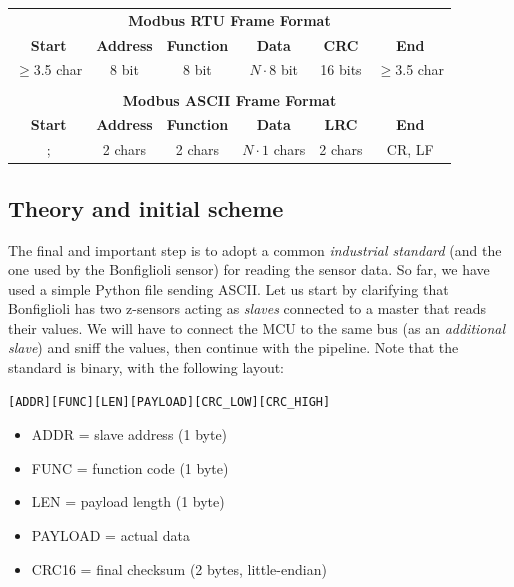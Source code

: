 \begin{table}[h]
\centering
\begin{tabular}{c c c c c c}
\multicolumn{6}{c}{\textbf{Modbus RTU Frame Format}}\\[4pt]
\textbf{Start} & \textbf{Address} & \textbf{Function} & \textbf{Data} & \textbf{CRC} & \textbf{End} \\
$\geq$3.5 char & 8 bit & 8 bit & $N \cdot 8$ bit & 16 bits & $\geq$3.5 char \\
\\
\multicolumn{6}{c}{\textbf{Modbus ASCII Frame Format}}\\[4pt]
\textbf{Start} & \textbf{Address} & \textbf{Function} & \textbf{Data} & \textbf{LRC} & \textbf{End} \\
; & 2 chars & 2 chars & $N \cdot 1$ chars & 2 chars & CR, LF \\
\end{tabular}
\end{table}

\subsection{Theory and initial scheme}

The final and important step is to adopt a common \textit{industrial standard} (and the one used by the Bonfiglioli sensor) for reading the sensor data. So far, we have used a simple Python file sending ASCII.  
Let us start by clarifying that Bonfiglioli has two z-sensors acting as \emph{slaves} connected to a master that reads their values. We will have to connect the MCU to the same bus (as an \textit{additional slave}) and sniff the values, then continue with the pipeline. Note that the standard is binary, with the following layout:

\begin{verbatim}
[ADDR][FUNC][LEN][PAYLOAD][CRC_LOW][CRC_HIGH]
\end{verbatim}

\begin{itemize}
    \item ADDR = slave address (1 byte)
    \item FUNC = function code (1 byte)
    \item LEN = payload length (1 byte)
    \item PAYLOAD = actual data
    \item CRC16 = final checksum (2 bytes, little-endian)
\end{itemize}

